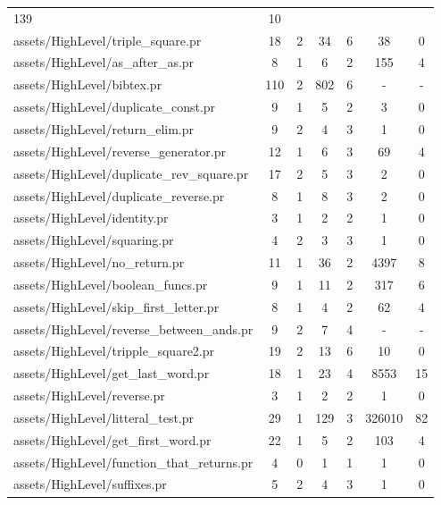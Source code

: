 \begin{tabular}{l|c|c|c|c|c|c}
         139 & 10  \\
            assets/HighLevel/triple\_square.pr &
        18 & 2 &
         34 & 6  &
         38 & 0  \\
            assets/HighLevel/as\_after\_as.pr &
        8 & 1 &
         6 & 2  &
         155 & 4  \\
            assets/HighLevel/bibtex.pr &
        110 & 2 &
         802 & 6  &
         - & -  \\
            assets/HighLevel/duplicate\_const.pr &
        9 & 1 &
         5 & 2  &
         3 & 0  \\
            assets/HighLevel/return\_elim.pr &
        9 & 2 &
         4 & 3  &
         1 & 0  \\
            assets/HighLevel/reverse\_generator.pr &
        12 & 1 &
         6 & 3  &
         69 & 4  \\
            assets/HighLevel/duplicate\_rev\_square.pr &
        17 & 2 &
         5 & 3  &
         2 & 0  \\
            assets/HighLevel/duplicate\_reverse.pr &
        8 & 1 &
         8 & 3  &
         2 & 0  \\
            assets/HighLevel/identity.pr &
        3 & 1 &
         2 & 2  &
         1 & 0  \\
            assets/HighLevel/squaring.pr &
        4 & 2 &
         3 & 3  &
         1 & 0  \\
            assets/HighLevel/no\_return.pr &
        11 & 1 &
         36 & 2  &
         4397 & 8  \\
            assets/HighLevel/boolean\_funcs.pr &
        9 & 1 &
         11 & 2  &
         317 & 6  \\
            assets/HighLevel/skip\_first\_letter.pr &
        8 & 1 &
         4 & 2  &
         62 & 4  \\
            assets/HighLevel/reverse\_between\_ands.pr &
        9 & 2 &
         7 & 4  &
         - & -  \\
            assets/HighLevel/tripple\_square2.pr &
        19 & 2 &
         13 & 6  &
         10 & 0  \\
            assets/HighLevel/get\_last\_word.pr &
        18 & 1 &
         23 & 4  &
         8553 & 15  \\
            assets/HighLevel/reverse.pr &
        3 & 1 &
         2 & 2  &
         1 & 0  \\
            assets/HighLevel/litteral\_test.pr &
        29 & 1 &
         129 & 3  &
         326010 & 82  \\
            assets/HighLevel/get\_first\_word.pr &
        22 & 1 &
         5 & 2  &
         103 & 4  \\
            assets/HighLevel/function\_that\_returns.pr &
        4 & 0 &
         1 & 1  &
         1 & 0  \\
            assets/HighLevel/suffixes.pr &
        5 & 2 &
         4 & 3  &
         1 & 0  \\
        \bottomrule
\end{tabular}


